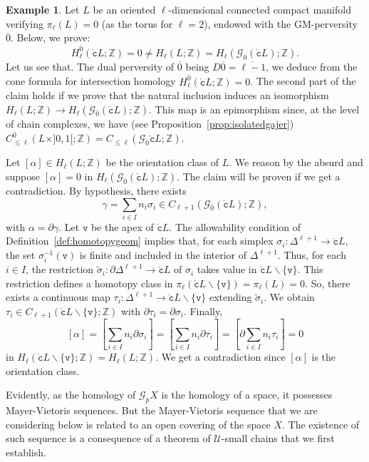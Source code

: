 \documentclass[a4paper,10pt,english,reqno]{amsart}
\theoremstyle{plain}
\theoremstyle{definition}
\newtheorem{example}[proposition]{Example}
\theoremstyle{remark}
\numberwithin{equation}{section}
\newcommand{\propref}[1]{Proposition~\ref{#1}}
\newcommand{\defref}[1]{Definition~\ref{#1}}
\def\ov{\overline}
\def\cU{{\mathcal U}}
\def\crG{{\mathscr G}}
\def\tc{{\mathtt c}}
\def\tv{{\mathtt v}}
\def\Z{\mathbb{Z}}
\def\rc{{\mathring{\tc}}}
\def\menos{\backslash}
\renewcommand\1{\hbox{\ding{192}}}
\renewcommand\2{\hbox{\ding{193}}}
\newcommand\3{\hbox{\ding{194}}}
\newcommand\4{\hbox{\ding{195}}}
\begin{document}
\begin{example}\label{exam:gajernotintersection}
%
Let $L$ be  an oriented $\ell$-dimensional connected compact manifold verifying 
$ \pi_\ell (L)=0$ (as the torus for $\ell=2$), endowed with the GM-perversity $\ov{0}$.
Below, we prove: 
$$
H_\ell^{\ov 0} (\rc L;\Z) =  0 
\ne H_{\ell} (L;\Z) =H_\ell (\crG_{\ov 0}( \rc L) ;\Z).
$$
Let us see that.
The dual perversity of $\ov 0$ being $D\ov 0= \ov{\ell-1}$, we deduce from the cone formula 
for intersection homology $H_\ell^{\ov 0} (\rc L;\Z) =  0 $.
The second part of the claim holds if we prove that the natural inclusion induces an isomorphism 
$ H_\ell (L;\Z)  \to H_\ell (\crG_{\ov 0}( \rc L);\Z) $. 
This map is  an epimorphism since, at the level of chain complexes, we have 
(see \propref{prop:isolatedgajer})
$C_{\leq \ell}^{\ov 0} (L\times ]0,1[;\Z) = C_{\leq \ell} (\crG_{\ov 0} \rc L;\Z)$.

Let  $[\alpha] \in H_\ell (L;\Z) $ be the orientation class of $L$. 
We reason by the absurd and suppose   $[\alpha] =  0$ in $H_\ell (\crG_{\ov 0}( \rc L);\Z)$. 
The claim will be proven if we get a contradiction.
By hypothesis, there exists
%
$$\gamma = \sum_{i\in I} n_i \sigma_i  \in C_{\ell + 1} (\crG_{\ov 0}( \rc L);\Z),$$ 
with $\alpha = \partial \gamma$.
Let $\tv$ be the apex of $\rc L$.
The allowability condition of \defref{def:homotopygeom} implies that, for each simplex $\sigma_i \colon \Delta^{\ell +1} \to \rc L$, the set
$\sigma_i^{-1}(\tv)$ 
is finite and included in the interior of ${\Delta}^{\ell+1}$.
Thus, for  each  $i \in I$, the restriction $\widetilde \sigma_i \colon \partial \Delta^{\ell+1} \to \rc L$ %
of $\sigma_i$ takes value in $\rc L \menos \{ \tv\}$.
This restriction defines a homotopy class in $\pi_\ell ( \rc L \menos \{ \tv\}) = \pi_\ell (L)=0$. 
So, there exists a continuous map $\tau_i \colon \Delta^{\ell+1} \to \rc L \menos \{ \tv\}$
extending $\widetilde \sigma_i$. 
We obtain $\tau_i \in  
 C_{\ell + 1} ( \rc L \menos \{ \tv\};\Z)
$ with $\partial \tau_i = \partial \sigma_i$. Finally,
$$
[\alpha] = \left[ \sum_{i\in I} n_i  \partial \sigma_i\right] = \left[ \sum_{i\in I} n_i  \partial \tau_i\right]= 
 \left[ \partial \sum_{i\in I} n_i   \tau_i\right] = 0
$$
in  $ H_{\ell } ( \rc L \menos \{ \tv\};\Z) =  H_{\ell } ( L;\Z)
$.
We get a contradiction since $[\alpha]$ is the orientation class.
\end{example}


\medskip
%
Evidently, as the homology of $\crG_{\ov{p}}X$ is the homology of a space, it possesses  Mayer-Vietoris sequences. 
But the Mayer-Vietoris sequence that we are considering below is related to an open covering of the  space $X$. 
The existence of such  sequence is a consequence of a theorem of $\cU$-small chains that we first establish. 
\end{document}
